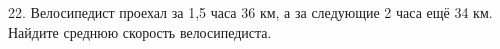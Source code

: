 22. Велосипедист проехал за 1,5 часа 36 км, а за следующие 2 часа ещё 34 км. Найдите среднюю скорость велосипедиста.\\
